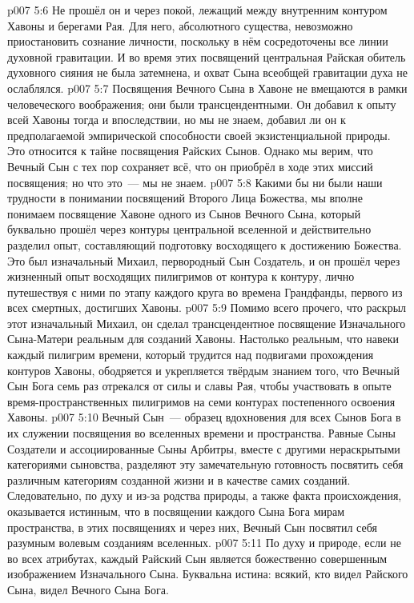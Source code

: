 \vs p007 5:6 Не прошёл он и через покой, лежащий между внутренним контуром Хавоны и берегами Рая. Для него, абсолютного существа, невозможно приостановить сознание личности, поскольку в нём сосредоточены все линии духовной гравитации. И во время этих посвящений центральная Райская обитель духовного сияния не была затемнена, и охват Сына всеобщей гравитации духа не ослаблялся.
\vs p007 5:7 \pc Посвящения Вечного Сына в Хавоне не вмещаются в рамки человеческого воображения; они были трансцендентными. Он добавил к опыту всей Хавоны тогда и впоследствии, но мы не знаем, добавил ли он к предполагаемой эмпирической способности своей экзистенциальной природы. Это относится к тайне посвящения Райских Сынов. Однако мы верим, что Вечный Сын с тех пор сохраняет всё, что он приобрёл в ходе этих миссий посвящения; но что это~--- мы не знаем.
\vs p007 5:8 \pc Какими бы ни были наши трудности в понимании посвящений Второго Лица Божества, мы вполне понимаем посвящение Хавоне одного из Сынов Вечного Сына, который буквально прошёл через контуры центральной вселенной и действительно разделил опыт, составляющий подготовку восходящего к достижению Божества. Это был изначальный Михаил, первородный Сын Создатель, и он прошёл через жизненный опыт восходящих пилигримов от контура к контуру, лично путешествуя с ними по этапу каждого круга во времена Грандфанды, первого из всех смертных, достигших Хавоны.
\vs p007 5:9 Помимо всего прочего, что раскрыл этот изначальный Михаил, он сделал трансцендентное посвящение Изначального Сына\hyp{}Матери реальным для созданий Хавоны. Настолько реальным, что навеки каждый пилигрим времени, который трудится над подвигами прохождения контуров Хавоны, ободряется и укрепляется твёрдым знанием того, что Вечный Сын Бога семь раз отрекался от силы и славы Рая, чтобы участвовать в опыте время\hyp{}пространственных пилигримов на семи контурах постепенного освоения Хавоны.
\vs p007 5:10 \pc Вечный Сын~--- образец вдохновения для всех Сынов Бога в их служении посвящения во вселенных времени и пространства. Равные Сыны Создатели и ассоциированные Сыны Арбитры, вместе с другими нераскрытыми категориями сыновства, разделяют эту замечательную готовность посвятить себя различным категориям созданной жизни и в качестве самих созданий. Следовательно, по духу и из\hyp{}за родства природы, а также факта происхождения, оказывается истинным, что в посвящении каждого Сына Бога мирам пространства, в этих посвящениях и через них, Вечный Сын посвятил себя разумным волевым созданиям вселенных.
\vs p007 5:11 По духу и природе, если не во всех атрибутах, каждый Райский Сын является божественно совершенным изображением Изначального Сына. Буквальна истина: всякий, кто видел Райского Сына, видел Вечного Сына Бога.
